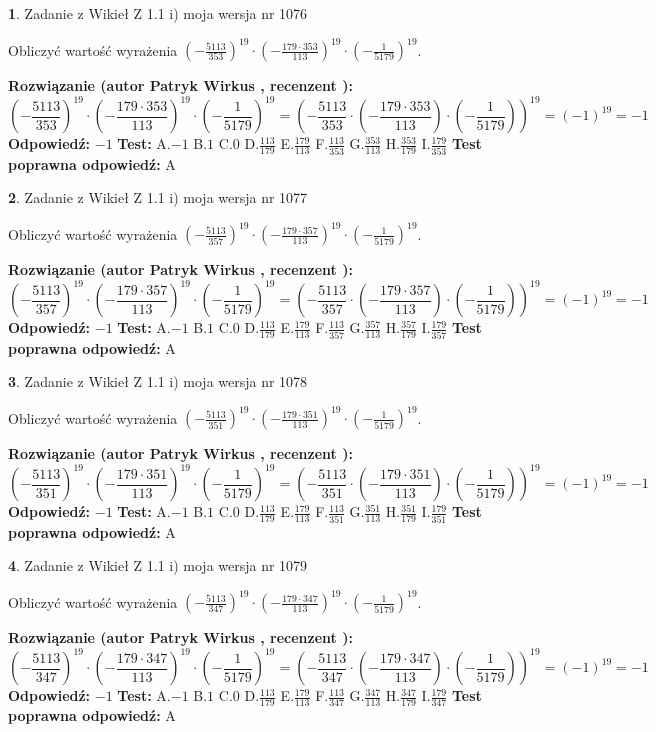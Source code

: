 \documentclass[12pt, a4paper]{article}
\theoremstyle{definition} %
\newtheorem{zad}{}
\newcommand{\zadStart}[1]{\begin{zad}#1\newline}
\newcommand{\zadStop}{\end{zad}}
\newcommand{\rozwStart}[2]{\noindent \textbf{Rozwiązanie (autor #1 , recenzent #2): }\newline}
\newcommand{\rozwStop}{\newline}
\newcommand{\odpStart}{\noindent \textbf{Odpowiedź:}\newline}
\newcommand{\odpStop}{\newline}
\newcommand{\testStart}{\noindent \textbf{Test:}\newline}
\newcommand{\testStop}{\newline}
\newcommand{\kluczStart}{\noindent \textbf{Test poprawna odpowiedź:}\newline}
\newcommand{\kluczStop}{\newline}
\begin{document}
\zadStart{Zadanie z Wikieł Z 1.1 i) moja wersja nr 1076}

Obliczyć wartość wyrażenia $(-\frac{5113}{353})^{19} \cdot (-\frac{179 \cdot 353}{113})^{19} \cdot (-\frac{1}{5179})^{19}$.
\zadStop
\rozwStart{Patryk Wirkus}{}
$$(-\frac{5113}{353})^{19} \cdot (-\frac{179 \cdot 353}{113})^{19} \cdot (-\frac{1}{5179})^{19} = (-\frac{5113}{353} \cdot (-\frac{179 \cdot 353}{113}) \cdot (-\frac{1}{5179}))^{19} = (-1)^{19} = -1$$
\rozwStop
\odpStart
$-1$
\odpStop
\testStart
A.$-1$ B.$1$ C.$0$ D.$\frac{113}{179}$ E.$\frac{179}{113}$
F.$\frac{113}{353}$ G.$\frac{353}{113}$
H.$\frac{353}{179}$
I.$\frac{179}{353}$
\testStop
\kluczStart
A
\kluczStop



\zadStart{Zadanie z Wikieł Z 1.1 i) moja wersja nr 1077}

Obliczyć wartość wyrażenia $(-\frac{5113}{357})^{19} \cdot (-\frac{179 \cdot 357}{113})^{19} \cdot (-\frac{1}{5179})^{19}$.
\zadStop
\rozwStart{Patryk Wirkus}{}
$$(-\frac{5113}{357})^{19} \cdot (-\frac{179 \cdot 357}{113})^{19} \cdot (-\frac{1}{5179})^{19} = (-\frac{5113}{357} \cdot (-\frac{179 \cdot 357}{113}) \cdot (-\frac{1}{5179}))^{19} = (-1)^{19} = -1$$
\rozwStop
\odpStart
$-1$
\odpStop
\testStart
A.$-1$ B.$1$ C.$0$ D.$\frac{113}{179}$ E.$\frac{179}{113}$
F.$\frac{113}{357}$ G.$\frac{357}{113}$
H.$\frac{357}{179}$
I.$\frac{179}{357}$
\testStop
\kluczStart
A
\kluczStop



\zadStart{Zadanie z Wikieł Z 1.1 i) moja wersja nr 1078}

Obliczyć wartość wyrażenia $(-\frac{5113}{351})^{19} \cdot (-\frac{179 \cdot 351}{113})^{19} \cdot (-\frac{1}{5179})^{19}$.
\zadStop
\rozwStart{Patryk Wirkus}{}
$$(-\frac{5113}{351})^{19} \cdot (-\frac{179 \cdot 351}{113})^{19} \cdot (-\frac{1}{5179})^{19} = (-\frac{5113}{351} \cdot (-\frac{179 \cdot 351}{113}) \cdot (-\frac{1}{5179}))^{19} = (-1)^{19} = -1$$
\rozwStop
\odpStart
$-1$
\odpStop
\testStart
A.$-1$ B.$1$ C.$0$ D.$\frac{113}{179}$ E.$\frac{179}{113}$
F.$\frac{113}{351}$ G.$\frac{351}{113}$
H.$\frac{351}{179}$
I.$\frac{179}{351}$
\testStop
\kluczStart
A
\kluczStop



\zadStart{Zadanie z Wikieł Z 1.1 i) moja wersja nr 1079}

Obliczyć wartość wyrażenia $(-\frac{5113}{347})^{19} \cdot (-\frac{179 \cdot 347}{113})^{19} \cdot (-\frac{1}{5179})^{19}$.
\zadStop
\rozwStart{Patryk Wirkus}{}
$$(-\frac{5113}{347})^{19} \cdot (-\frac{179 \cdot 347}{113})^{19} \cdot (-\frac{1}{5179})^{19} = (-\frac{5113}{347} \cdot (-\frac{179 \cdot 347}{113}) \cdot (-\frac{1}{5179}))^{19} = (-1)^{19} = -1$$
\rozwStop
\odpStart
$-1$
\odpStop
\testStart
A.$-1$ B.$1$ C.$0$ D.$\frac{113}{179}$ E.$\frac{179}{113}$
F.$\frac{113}{347}$ G.$\frac{347}{113}$
H.$\frac{347}{179}$
I.$\frac{179}{347}$
\testStop
\kluczStart
A
\kluczStop
\end{document}
